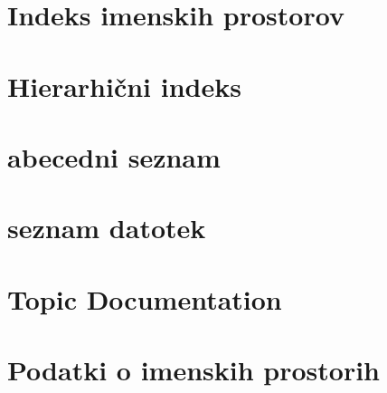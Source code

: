 \documentclass[twoside]{book}
\newcommand{\+}{\discretionary{\mbox{\scriptsize$\hookleftarrow$}}{}{}}
\begin{document}
\chapter{Indeks imenskih prostorov}

\chapter{Hierarhični indeks}

\chapter{abecedni seznam}

\chapter{seznam datotek}

\chapter{Topic Documentation}












\chapter{Podatki o imenskih prostorih}



















\end{document}
